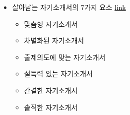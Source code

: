 \documentclass[12pt]{article}
\begin{document}
\begin{itemize}
    \bigskip
    \item 살아남는 자기소개서의 7가지 요소 \href{https://brunch.co.kr/@kuehyunpark/6}{link}
    \begin{itemize}
        \item 맞춤형 자기소개서
        \item 차별화된 자기소개서
        \item 출제의도에 맞는 자기소개서
        \item 설득력 있는 자기소개서
        \item 간결한 자기소개서
        \item 솔직한 자기소개서
    \end{itemize}

\end{itemize}
\end{document}
